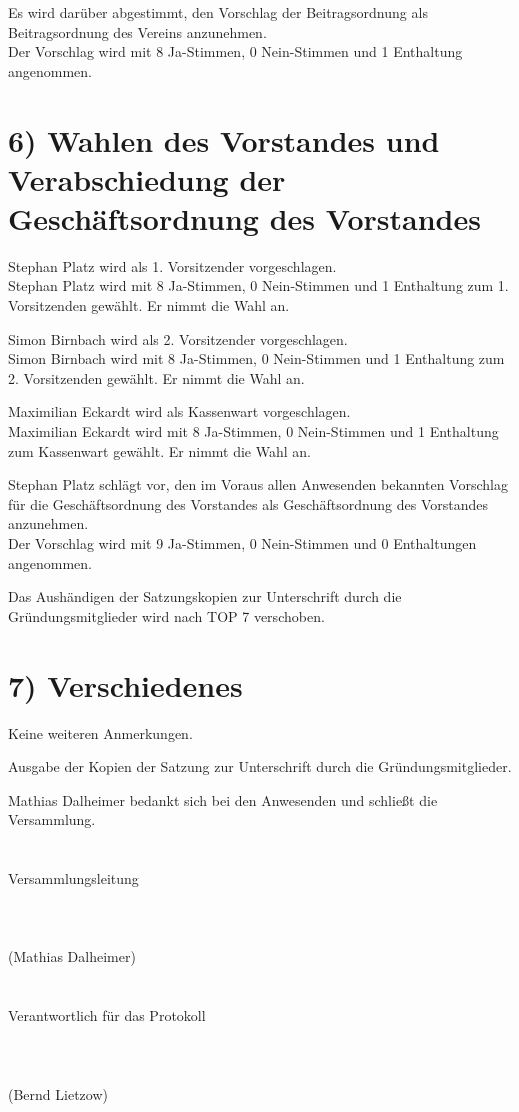 \documentclass{scrartcl}
\begin{document}
    Es wird darüber abgestimmt, den Vorschlag der Beitragsordnung als Beitragsordnung
    des Vereins anzunehmen.\\
    Der Vorschlag wird mit 8 Ja-Stimmen, 0 Nein-Stimmen und
    1 Enthaltung angenommen.

\section*{6) Wahlen des Vorstandes und Verabschiedung der Geschäftsordnung des Vorstandes}

    Stephan Platz wird als 1. Vorsitzender vorgeschlagen.\\
    Stephan Platz wird mit 8 Ja-Stimmen, 0 Nein-Stimmen und 1 Enthaltung zum 1.
    Vorsitzenden gewählt. Er nimmt die Wahl an.

    Simon Birnbach wird als 2. Vorsitzender vorgeschlagen.\\
    Simon Birnbach wird mit 8 Ja-Stimmen, 0 Nein-Stimmen und 1 Enthaltung zum 2.
    Vorsitzenden gewählt. Er nimmt die Wahl an.

    Maximilian Eckardt wird als Kassenwart vorgeschlagen.\\
    Maximilian Eckardt wird mit 8 Ja-Stimmen, 0 Nein-Stimmen und 1 Enthaltung zum
    Kassenwart gewählt. Er nimmt die Wahl an.

    Stephan Platz schlägt vor, den im Voraus allen Anwesenden bekannten Vorschlag für
    die Geschäftsordnung des Vorstandes als Geschäftsordnung des Vorstandes anzunehmen.\\
    Der Vorschlag wird mit 9 Ja-Stimmen, 0 Nein-Stimmen und 0 Enthaltungen angenommen.

    Das Aushändigen der Satzungskopien zur Unterschrift durch die Gründungsmitglieder
    wird nach TOP 7 verschoben.

\section*{7) Verschiedenes}

    Keine weiteren Anmerkungen.

    Ausgabe der Kopien der Satzung zur Unterschrift durch die Gründungsmitglieder.

    Mathias Dalheimer bedankt sich bei den Anwesenden und schließt die Versammlung.

\section*{}

Versammlungsleitung\\
\\
\\
\\
(Mathias Dalheimer)\\
\\
\\
Verantwortlich für das Protokoll\\
\\
\\
\\
(Bernd Lietzow)
\end{document}
